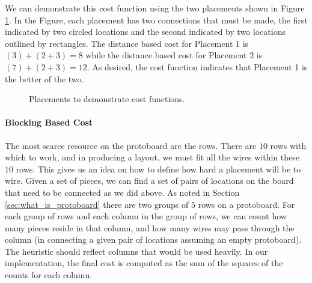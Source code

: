 We can demonstrate this cost function using the two placements shown in Figure
\ref{fig:placement_costs}. In the Figure, each placement has two connections
that must be made, the first indicated by two circled locations and the second
indicated by two locations outlined by rectangles. The distance based cost for
Placement 1 is $(3) + (2 + 3) = 8$ while the distance based cost for Placement 2
is $(7) + (2 + 3) = 12$. As desired, the cost function indicates that Placement 1
is the better of the two.

\begin{figure}[H]
\centering
{}
\caption{Placements to demonstrate cost functions.}
\label{fig:placement_costs}
\end{figure}

\paragraph{Blocking Based Cost}
The most scarce resource on the protoboard are the rows. There are $10$ rows
with which to work, and in producing a layout, we must fit all the wires within
these $10$ rows. This gives us an idea on how to define how hard a placement
will be to wire. Given a set of pieces, we can find a set of pairs of locations
on the board that need to be connected as we did above.
As noted in Section \ref{sec:what_is_protoboard} there are two groups of $5$
rows on a protoboard. For each group of rows and each column in the group of
rows, we can count how many pieces reside in that column, and how many wires may
pass through the column (in connecting a given pair of locations assuming an
empty protoboard). The heuristic should reflect columns that
would be used heavily. In our implementation, the final cost is computed as
the sum of the squares of the counts for each column.

